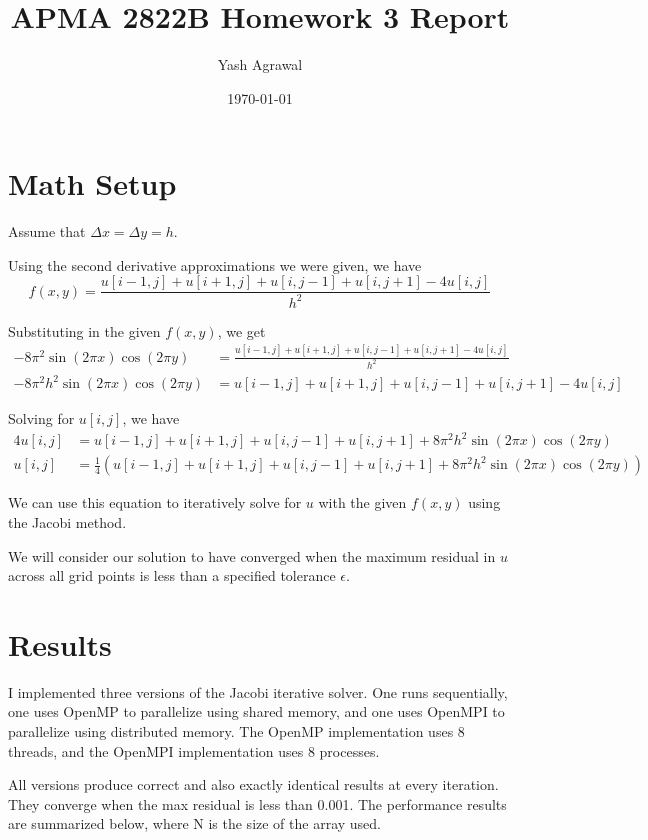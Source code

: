 \documentclass[11pt]{article}
\title{APMA 2822B Homework 3 Report}
\author{Yash Agrawal}
\date{\today}
\begin{document}
\maketitle

\section*{Math Setup}
Assume that $\Delta x = \Delta y = h$. 

Using the second derivative approximations we were given, we have
\[
    f(x, y) = \frac{u[i-1, j] + u[i+1, j] + u[i, j-1] + u[i, j+1] - 4u[i, j]}{h^2}
\]

Substituting in the given $f(x, y)$, we get
\begin{align*}
    -8\pi^2 \sin(2\pi x) \cos(2\pi y) &= \frac{u[i-1, j] + u[i+1, j] + u[i, j-1] + u[i, j+1] - 4u[i, j]}{h^2} \\
    -8\pi^2 h^2 \sin(2\pi x) \cos(2\pi y) &= u[i-1, j] + u[i+1, j] + u[i, j-1] + u[i, j+1] - 4u[i, j]
\end{align*}

Solving for $u[i, j]$, we have
\begin{align*}
    4u[i, j] &= u[i-1, j] + u[i+1, j] + u[i, j-1] + u[i, j+1] + 8\pi^2 h^2 \sin(2\pi x) \cos(2\pi y) \\
    u[i, j] &= \frac{1}{4} \left( u[i-1, j] + u[i+1, j] + u[i, j-1] + u[i, j+1] + 8\pi^2 h^2 \sin(2\pi x) \cos(2\pi y) \right)
\end{align*}

We can use this equation to iteratively solve for $u$ with the given $f(x, y)$ using the Jacobi method. 

We will consider our solution to have converged when the maximum residual in $u$ across all grid points is less than a specified tolerance $\epsilon$.

\section*{Results}

I implemented three versions of the Jacobi iterative solver. One runs sequentially, one uses OpenMP to parallelize using shared memory, and one uses OpenMPI to parallelize using distributed memory. The OpenMP implementation uses 8 threads, and the OpenMPI implementation uses 8 processes. 

All versions produce correct and also exactly identical results at every iteration. They converge when the max residual is less than 0.001. The performance results are summarized below, where N is the size of the array used.
\end{document}
